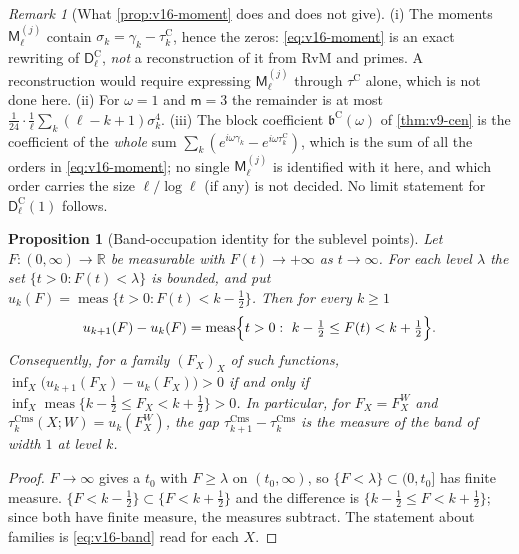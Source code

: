 \documentclass[11pt,a4paper]{article}
\numberwithin{equation}{section}
\newtheorem{proposition}[theorem]{Proposition}
\theoremstyle{definition}
\theoremstyle{remark}
\newtheorem{remark}[theorem]{Remark}
\newcommand{\meas}{\operatorname{meas}}
\newcommand{\Cms}{\mathrm{Cms}}
\begin{document}
\begin{remark}[What \cref{prop:v16-moment} does and does not give]\label{rem:v16-diag}
(i) The moments $\mathsf M_\ell^{(j)}$ contain $\sigma_k=\gamma_k-\tau_k^{\mathrm C}$, hence the zeros: \eqref{eq:v16-moment} is an exact rewriting of $\mathsf D_\ell^{\mathrm C}$, \emph{not} a reconstruction of it from RvM and primes. A reconstruction would require expressing $\mathsf M_\ell^{(j)}$ through $\tau^{\mathrm C}$ alone, which is not done here. (ii) For $\omega=1$ and $\mathsf m=3$ the remainder is at most $\frac1{24}\cdot\frac1\ell\sum_k(\ell-k+1)\sigma_k^4$. (iii) The block coefficient $\mathfrak b^{\mathrm C}(\omega)$ of \cref{thm:v9-cen} is the coefficient of the \emph{whole} sum $\sum_k(e^{i\omega\gamma_k}-e^{i\omega\tau_k^{\mathrm C}})$, which is the sum of all the orders in \eqref{eq:v16-moment}; no single $\mathsf M_\ell^{(j)}$ is identified with it here, and which order carries the size $\ell/\log\ell$ (if any) is not decided. No limit statement for $\mathsf D_\ell^{\mathrm C}(1)$ follows.
\end{remark}

\begin{proposition}[Band-occupation identity for the sublevel points]\label{prop:v16-band}
Let $F:(0,\infty)\to\mathbb R$ be measurable with $F(t)\to+\infty$ as $t\to\infty$. For each level $\lambda$ the set $\{t>0:F(t)<\lambda\}$ is bounded, and put $u_k(F)=\meas\{t>0:F(t)<k-\tfrac12\}$. Then for every $k\ge1$
\begin{equation}\label{eq:v16-band}
u_{k+1}(F)-u_k(F)=\meas\Bigl\{t>0:\ k-\tfrac12\le F(t)<k+\tfrac12\Bigr\}.
\end{equation}
Consequently, for a family $(F_X)_X$ of such functions, $\inf_X\bigl(u_{k+1}(F_X)-u_k(F_X)\bigr)>0$ if and only if $\inf_X\meas\{k-\frac12\le F_X<k+\frac12\}>0$. In particular, for $F_X=F_X^W$ and $\tau_k^{\Cms}(X;W)=u_k(F_X^W)$, the gap $\tau_{k+1}^{\Cms}-\tau_k^{\Cms}$ is the measure of the band of width $1$ at level $k$.
\end{proposition}
\begin{proof}
$F\to\infty$ gives a $t_0$ with $F\ge\lambda$ on $(t_0,\infty)$, so $\{F<\lambda\}\subset(0,t_0]$ has finite measure. $\{F<k-\frac12\}\subset\{F<k+\frac12\}$ and the difference is $\{k-\frac12\le F<k+\frac12\}$; since both have finite measure, the measures subtract. The statement about families is \eqref{eq:v16-band} read for each $X$.
\end{proof}
\end{document}

